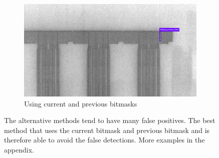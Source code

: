 \begin{figure}[!h]
\begin{subfigure}{.9\textwidth}
  \centering
  \includegraphics[width=\linewidth]{images/implementation/results/bm/bm_prev}
  \caption{Using current and previous bitmasks}
\end{subfigure}
\caption{The alternative methods tend to have many false positives. The best method that uses the current bitmask and previous bitmask and is therefore able to avoid the false detections. More examples in the appendix.}
\label{impl:bm_compareasdfsfsdf}
\end{figure}


